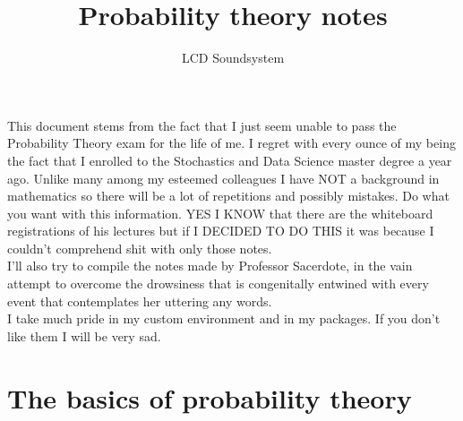 \documentclass{report}
\begin{document}
	\title{Probability theory notes}
	\author{LCD Soundsystem}
	\date{}
	\maketitle
	\begin{preface}
		This document stems from the fact that I just seem unable to pass the Probability Theory exam for the life of me. I regret with every ounce of my being the fact that I enrolled to the Stochastics and Data Science master degree a year ago.
		Unlike many among my esteemed colleagues I have NOT a background in mathematics so there will be a lot of repetitions and possibly mistakes. Do what you want with this information. YES I KNOW that there are the whiteboard registrations of his lectures but if I DECIDED TO DO THIS it was because I couldn't comprehend shit with only those notes.\\
		I'll also try to compile the notes made by Professor Sacerdote, in the vain attempt to overcome the drowsiness that is congenitally entwined with every event that contemplates her uttering any words.\\
		I take much pride in my custom environment and in my packages. If you don't like them I will be very sad. \\
		\vskip1.2cm
	
	\end{preface}
	\tableofcontents
	\chapter{The basics of probability theory}
\end{document}
